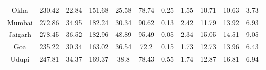 \documentclass{article}
\begin{document}
\begin{table}[t]
{\begin{adjustwidth}{-0.25in}{0in}
\begin{tabular}{ccccccllccc}
	Okha                                                                                              & 230.42                    & 22.84                      & 151.68                    & 25.58                   & 78.74                                                                                                                & 0.25                                     & 1.55                                    & 10.71                                           & 10.63                                          & 3.73               \\
	Mumbai                                                                                            & 272.86                    & \multicolumn{1}{c|}{34.95} & 182.24                    & 30.34                   & 90.62                                                                                                                & 0.13                                     & 2.42                                    & 11.79                                           & 13.92                                          & 6.93               \\
	Jaigarh                                                                                           & 278.45                    & 36.52                      & 182.96                    & 48.89                   & 95.49                                                                                                                & 0.05                                     & 2.34                                    & 15.05                                           & 14.51                                          & 9.05               \\
	Goa                                                                                               & 235.22                    & 30.34                      & 163.02                    & 36.54                   & 72.2                                                                                                                 & 0.15                                     & 1.73                                    & 12.73                                           & 13.96                                          & 6.43               \\
	Udupi                                                                                             & 247.81                    & 34.37                      & 169.37                    & 38.8                    & 78.43                                                                                                                & 0.55                                     & 1.74                                    & 12.87                                           & 16.81                                          & 6.94               \\

\end{tabular}
\end{adjustwidth}}
\end{table}
\end{document}
